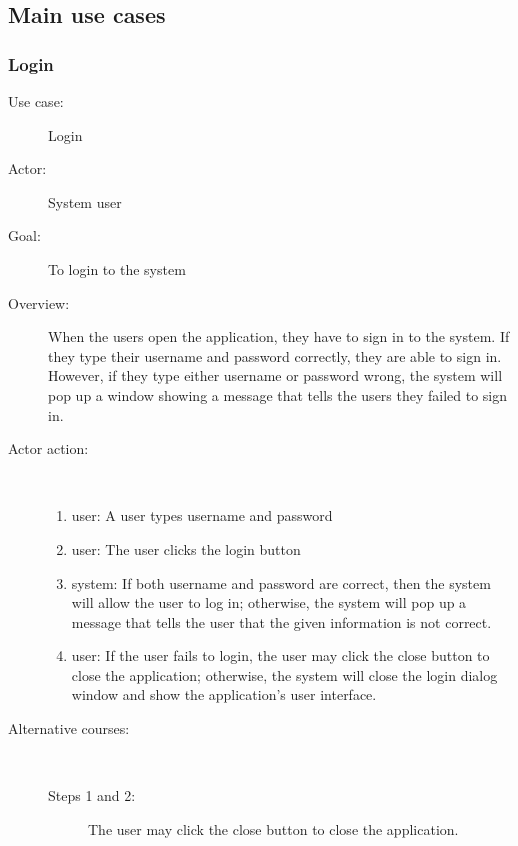 \documentclass[11pt, oneside]{article}   	%
\begin{document}
\subsection{Main use cases}

\subsubsection{Login}
\begin{description}
\item[Use case:] Login
\item[Actor:] System user
\item[Goal:] To login to the system
\item[Overview:] When the users open the application, they have to sign in to the system. 
If they type their username and password correctly, they are able to sign in. 
However, if they type either username or password wrong, the system will pop up a window showing a message that tells the users they failed to sign in.
\item[Actor action:]
\
\begin{enumerate}
\item user: A user types username and password
\item user: The user clicks the login button
\item system: If both username and password are correct, then the system will allow the user to log in; otherwise, the system will pop up a message that tells the user that the given information is not correct.
\item user: If the user fails to login, the user may click the close button to close the application; otherwise, the system will close the login dialog window and show the application's user interface.
\end{enumerate}

\item[Alternative courses:]
\
\begin{description}
\item[Steps 1 and 2:] The user may click the close button to close the application.
\end{description}

\end{description}
\end{document}
